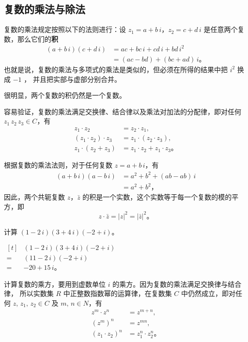\subsection{复数的乘法与除法}\label{subsec:5-5}

复数的乘法规定按照以下的法则进行：设 $z_1 = a + b\,i$，$z_2 = c + d\,i$ 是任意两个复数，那么它们的\textbf{积}
\begin{align*}
    (a + b\,i)(c + d\,i) &= ac + bc\,i + cd\,i + bd\,i^2 \\[-1em]
        &=(ac - bd) + (bc + ad)\,i \text{。}
\end{align*}
也就是说，复数的乘法与多项式的乘法是类似的，但必须在所得的结果中把 $i^2$ 换成 $-1$ ，
并且把实部与虚部分别合并。

很明显，两个复数的积仍然是一个复数。

容易验证，复数的乘法满足交换律、结合律以及乘法对加法的分配律，即对任何 $z_1\, z_2\, z_3 \in C$，有
\begin{align*}
    z_1 \cdot z_2 &= z_2 \cdot z_1 , \\[-1em]
    (z_1 \cdot z_2) \cdot z_3 &= z_1 \cdot (z_2 \cdot z_3) , \\[-1em]
    z_1 \cdot (z_2 + z_3) &= z_1 \cdot z_2 + z_1 \cdot z_3 \text{。}
\end{align*}

根据复数的乘法法则，对于任何复数 $z = a + b\,i$，有
\begin{align*}
    (a + b\,i)(a - b\,i) &= a^2 + b^2 + (ab - ab)\,i \\[-1em]
        &= a^2 + b^2 \text{，}
\end{align*}
因此，两个共轭复数 $z$，$\bar{z}$ 的积是一个实数，这个实数等于每一个复数的模的平方，即
$$ z \cdot \bar{z} = |z|^2 = |\bar{z}|^2 \text{。} $$

\liti 计算 $(1 -2\,i)(3 + 4\,i)(-2 + i)$。

\jie \quad $\begin{aligned}[t]
        & (1 -2\,i)(3 + 4\,i)(-2 + i) \\[-1em]
    ={} & (11 - 2\,i)(-2 + i) \\[-1em]
    ={} & -20 + 15\,i \text{。}
\end{aligned}$

计算复数的乘方，要用到虚数单位 $i$ 的乘方。因为复数的乘法满足交换律与结合律，
所以实数集 $R$ 中正整数指数幂的运算律，在复数集 $C$ 中仍然成立，即对任何
$z,\, z_1,\, z_2 \in C$ 及 $m,\, n \in N$，有
\begin{align*}
    z^m \cdot z^n &= z^{m + n}, \\
    (z^m)^n &= z^{mn}, \\
    (z_1 \cdot z_2)^n &= z_1^n \cdot z_2^n \text{。}
\end{align*}

